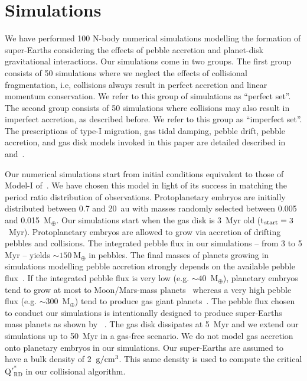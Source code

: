 \documentclass[fleqn,usenatbib]{mnras}
\begin{document}
\section{Simulations}\label{sec:simulations}

We have performed 100 N-body numerical simulations modelling the formation of super-Earths considering the effects of pebble accretion and planet-disk gravitational interactions. Our simulations come in two groups. The first group consists of 50 simulations where we neglect the effects of collisional fragmentation, i.e, collisions always result in perfect accretion and linear momentum conservation. We refer to this group of simulations as ``perfect set''. The second group consists of 50 simulations where collisions may also result in imperfect accretion, as described before. We refer to this group as ``imperfect set''. The prescriptions of type-I migration, gas tidal damping, pebble drift, pebble accretion, and gas disk models invoked in this paper are detailed described in~\cite{lambrechtsetal19} and~\cite{izidoro2019formation}. 

Our numerical simulations start from initial conditions equivalent to those of Model-I of~\cite{izidoro2019formation}. We have chosen this model in light of its success in matching the period ratio distribution of observations. Protoplanetary embryos are initially distributed between 0.7 and 20~au with masses randomly selected between 0.005 and 0.015~M$_{\oplus}$. Our simulations start when the gas disk is 3~Myr old (t$_{\rm start}=3$~Myr). Protoplanetary embryos are allowed to grow via accretion of drifting pebbles and collisions. The integrated pebble flux in our simulations -- from 3 to 5 Myr -- yields $\sim 150~$M$_{\oplus}$ in pebbles. The final masses of planets growing in simulations modelling pebble accretion strongly depends on the available pebble flux~\citep{lambrechtsetal19,izidoro2019formation,bitschetal19}. If the integrated pebble flux is very low (e.g. $\sim 40$~M$_{\oplus}$), planetary embryos tend to grow at most to Moon/Mars-mass planets~\citep{lambrechtsetal19,izidoroetal21} whereas a very high pebble flux (e.g. $\sim 300$~M$_{\oplus}$) tend to produce gas giant planets~\citep{bitschetal19}. The pebble flux chosen to conduct our simulations is intentionally designed to produce super-Earths mass planets as shown by ~\cite{izidoro2019formation}. The gas disk dissipates at 5~Myr and we extend our simulations up to 50~Myr in a gas-free scenario. We do not model gas accretion onto planetary embryos in our simulations. Our super-Earths are assumed to have a bulk density of 2~${\rm g/cm^3}$. This same density is used to compute the critical Q$'^*_{\text{RD}}$ in our collisional algorithm.
\end{document}
